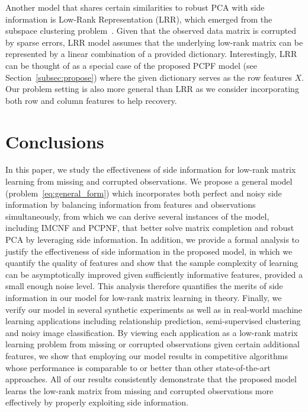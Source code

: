 \documentclass[twoside,11pt]{article}
\begin{document}
Another model that shares certain similarities to robust PCA with side information is
Low-Rank Representation (LRR), which emerged from the subspace clustering problem~\citep{Liu10a, Liu13a}.
Given that the observed data matrix is corrupted by sparse errors,
LRR model assumes that the underlying low-rank matrix can be represented by a linear
combination of a provided dictionary.
Interestingly, LRR can be thought of as a special
case of the proposed PCPF model (see Section~\ref{subsec:propose})
where the given dictionary serves as
the row features $X$.  Our problem setting is also more general than LRR as we
consider incorporating both row and column features to help recovery.

\section{Conclusions}
\label{sec:conclusion}
In this paper, we study the effectiveness of side information for
low-rank matrix learning from missing and corrupted observations.
We propose a general model (problem~\eqref{eq:general_form}) which incorporates both perfect and noisy side information
by balancing information from features and observations simultaneously,
from which we can derive several instances of the model, including IMCNF and PCPNF,
that better solve matrix completion and robust PCA by leveraging side information.
In addition, we provide a formal analysis to justify the effectiveness of side information
in the proposed model, in which we quantify the quality of features and show that
the sample complexity of learning can be asymptotically improved given sufficiently informative
features, provided a small enough noise level.
This analysis therefore quantifies the merits of side information in our model for low-rank matrix learning in theory.
Finally, we verify our model in several synthetic experiments
as well as in real-world machine learning applications including
relationship prediction, semi-supervised clustering and noisy image classification.
By viewing each application as a low-rank matrix learning problem from missing or corrupted observations
given certain additional features,
we show that employing our model results in competitive
algorithms whose performance is comparable to or better than other state-of-the-art approaches.
All of our results consistently demonstrate that the proposed model learns
the low-rank matrix from missing and corrupted observations more effectively
by properly exploiting side information.


\end{document}
